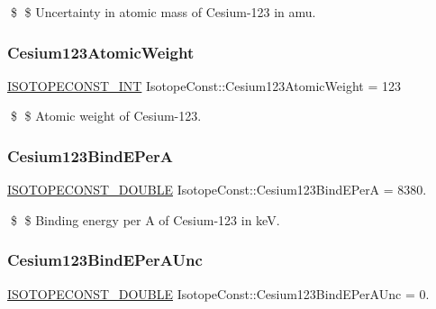 \$ \$ Uncertainty in atomic mass of Cesium-\/123 in amu. \mbox{\label{group___isotope_const-_cesium-_cs123_gaf7904bf590fc12bd43fa108a6a1f99de}} 
\subsubsection{\texorpdfstring{Cesium123\+Atomic\+Weight}{Cesium123AtomicWeight}}
{\footnotesize\ttfamily \mbox{\hyperlink{group___isotope_const-_macros_ga5f18360b3e99483a35c32d789e62621c}{I\+S\+O\+T\+O\+P\+E\+C\+O\+N\+S\+T\+\_\+\+I\+NT}} Isotope\+Const\+::\+Cesium123\+Atomic\+Weight = 123}

\$ \$ Atomic weight of Cesium-\/123. \mbox{\label{group___isotope_const-_cesium-_cs123_ga8745d59fc3d4495cbd9fe9d9a254617b}} 
\subsubsection{\texorpdfstring{Cesium123\+Bind\+E\+PerA}{Cesium123BindEPerA}}
{\footnotesize\ttfamily \mbox{\hyperlink{group___isotope_const-_macros_ga8f45a7272ce02c0b4c65c44636ed719a}{I\+S\+O\+T\+O\+P\+E\+C\+O\+N\+S\+T\+\_\+\+D\+O\+U\+B\+LE}} Isotope\+Const\+::\+Cesium123\+Bind\+E\+PerA = 8380.}

\$ \$ Binding energy per A of Cesium-\/123 in keV. \mbox{\label{group___isotope_const-_cesium-_cs123_ga86e08b3eecc4b164b5cda72a46a2562c}} 
\subsubsection{\texorpdfstring{Cesium123\+Bind\+E\+Per\+A\+Unc}{Cesium123BindEPerAUnc}}
{\footnotesize\ttfamily \mbox{\hyperlink{group___isotope_const-_macros_ga8f45a7272ce02c0b4c65c44636ed719a}{I\+S\+O\+T\+O\+P\+E\+C\+O\+N\+S\+T\+\_\+\+D\+O\+U\+B\+LE}} Isotope\+Const\+::\+Cesium123\+Bind\+E\+Per\+A\+Unc = 0.}

